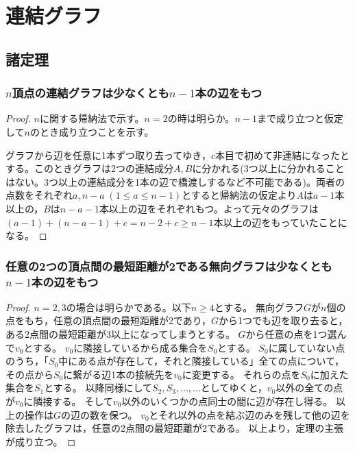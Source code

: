 \chapter{連結グラフ}
    \section{諸定理}
        \subsection{\texorpdfstring{$n$}{n}頂点の連結グラフは少なくとも\texorpdfstring{$n-1$}{n-1}本の辺をもつ}
            \begin{proof}
                $n$に関する帰納法で示す。$n=2$の時は明らか。$n-1$まで成り立つと仮定して$n$のとき成り立つことを示す。
                \par
                グラフから辺を任意に1本ずつ取り去ってゆき，$c$本目で初めて非連結になったとする。このときグラフは2つの連結成分$A,B$に分かれる(3つ以上に分かれることはない。3つ以上の連結成分を1本の辺で橋渡しするなど不可能である)。両者の点数をそれぞれ$a,n-a\;(1\leq a\leq n-1)$とすると帰納法の仮定より$A$は$a-1$本以上の，$B$は$n-a-1$本以上の辺をそれぞれもつ。よって元々のグラフは$(a-1)+(n-a-1)+c = n-2+c \geq n-1$本以上の辺をもっていたことになる。
            \end{proof}
        \subsection{任意の2つの頂点間の最短距離が2である無向グラフは少なくとも\texorpdfstring{$n-1$}{n-1}本の辺をもつ}
            \begin{proof}
                $n=2,3$の場合は明らかである。以下$n\geq4$とする。
                無向グラフ$G$が$n$個の点をもち，任意の頂点間の最短距離が2であり，$G$から1つでも辺を取り去ると，ある2点間の最短距離が3以上になってしまうとする。
                $G$から任意の点を1つ選んで$v_0$とする。
                $v_0$に隣接しているから成る集合を$S_0$とする。
                $S_0$に属していない点のうち，「$S_0$中にある点が存在して，それと隣接している」全ての点について，その点から$S_0$に繋がる辺1本の接続先を$v_0$に変更する。
                それらの点を$S_0$に加えた集合を$S_1$とする。
                以降同様にして$S_2,S_3,\dotsc,...$としてゆくと，$v_0$以外の全ての点が$v_0$に隣接する。
                そして$v_0$以外のいくつかの点同士の間に辺が存在し得る。
                以上の操作は$G$の辺の数を保つ。
                $v_0$とそれ以外の点を結ぶ辺のみを残して他の辺を除去したグラフは，任意の2点間の最短距離が2である。
                以上より，定理の主張が成り立つ。
            \end{proof}
